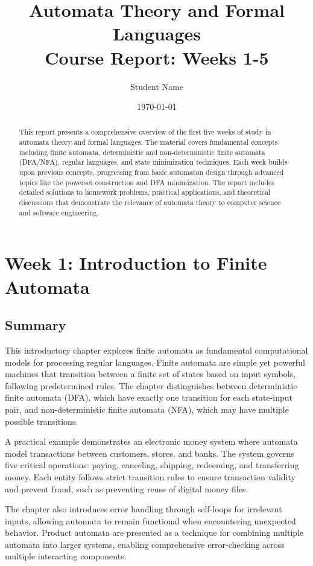\documentclass{article}
\title{Automata Theory and Formal Languages\\
\Large Course Report: Weeks 1-5}
\author{Student Name}
\date{\today}
\begin{document}
\maketitle

\begin{abstract}
This report presents a comprehensive overview of the first five weeks of study in automata theory and formal languages. The material covers fundamental concepts including finite automata, deterministic and non-deterministic finite automata (DFA/NFA), regular languages, and state minimization techniques. Each week builds upon previous concepts, progressing from basic automaton design through advanced topics like the powerset construction and DFA minimization. The report includes detailed solutions to homework problems, practical applications, and theoretical discussions that demonstrate the relevance of automata theory to computer science and software engineering.
\end{abstract}

\tableofcontents
\newpage

\section{Week 1: Introduction to Finite Automata}

\subsection{Summary}
This introductory chapter explores finite automata as fundamental computational models for processing regular languages. Finite automata are simple yet powerful machines that transition between a finite set of states based on input symbols, following predetermined rules. The chapter distinguishes between deterministic finite automata (DFA), which have exactly one transition for each state-input pair, and non-deterministic finite automata (NFA), which may have multiple possible transitions.

A practical example demonstrates an electronic money system where automata model transactions between customers, stores, and banks. The system governs five critical operations: paying, canceling, shipping, redeeming, and transferring money. Each entity follows strict transition rules to ensure transaction validity and prevent fraud, such as preventing reuse of digital money files.

The chapter also introduces error handling through self-loops for irrelevant inputs, allowing automata to remain functional when encountering unexpected behavior. Product automata are presented as a technique for combining multiple automata into larger systems, enabling comprehensive error-checking across multiple interacting components.
\end{document}
